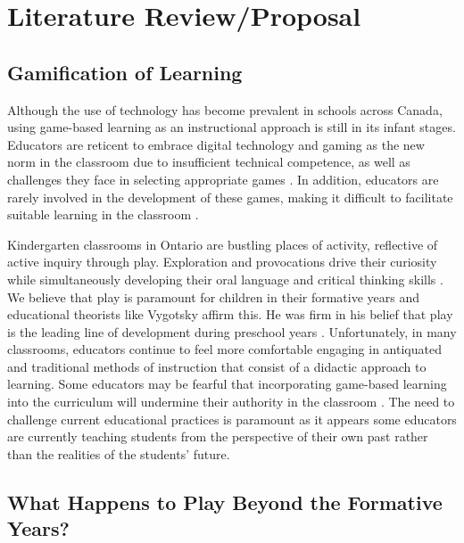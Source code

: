 \documentclass[10pt]{article}
\begin{document}
\newpage
       
\section{Literature Review/Proposal}

\subsection{Gamification of Learning}

Although the use of technology has become prevalent in schools across Canada, using game-based learning as an instructional approach is still in its infant stages. Educators are reticent to embrace digital technology and gaming as the new norm in the classroom due to insufficient technical competence, as well as challenges they face in selecting appropriate games \citep{jaaska2022teachers,molin2017role}. In addition, educators are rarely involved in the development of these games, making it difficult to facilitate suitable learning in the classroom \citep{molin2017role}. 

Kindergarten classrooms in Ontario are bustling places of activity, reflective of active inquiry through play. Exploration and provocations drive their curiosity while simultaneously developing their oral language and critical thinking skills \citep{kindergartencurriculum}. We believe that play is paramount for children in their formative years and educational theorists like Vygotsky affirm this. He was firm in his belief that play is the leading line of development during preschool years \citep{vygotsky1967play}. Unfortunately, in many classrooms, educators continue to feel more comfortable engaging in antiquated and traditional methods of instruction that consist of a didactic approach to learning. Some educators may be fearful that incorporating game-based learning into the curriculum will undermine their authority in the classroom \citep{jaaska2022teachers,chee2014facilitating,jong2016teachers}. The need to challenge current educational practices is paramount as it appears some educators are currently teaching students from the perspective of their own past rather than the realities of the students’ future. 

\subsection{What Happens to Play Beyond the Formative Years?}
\end{document}
